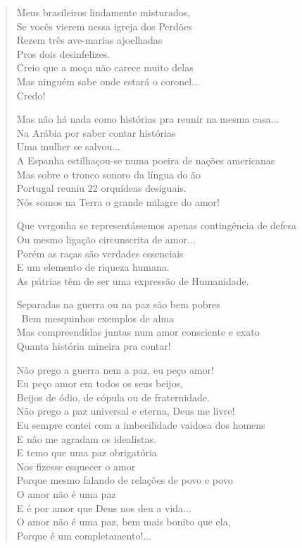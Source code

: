 \begin{verse}
Meus brasileiros lindamente misturados,\\
Se vocês vierem nessa igreja dos Perdões\\
Rezem três ave-marias ajoelhadas\\
Pros dois desinfelizes.\\
Creio que a moça não carece muito delas\\
Mas ninguém sabe onde estará o coronel...\\
Credo!

Mas não há nada como histórias pra reunir na mesma casa...\\
Na Arábia por saber contar histórias\\
Uma mulher se salvou...\\
A Espanha estilhaçou-se numa poeira de nações americanas\\
Mas sobre o tronco sonoro da língua do ão\\
Portugal reuniu 22 orquídeas desiguais.\\
Nós somos na Terra o grande milagre do amor!

Que vergonha se representássemos apenas contingência de defesa\\
Ou mesmo ligação circunscrita de amor...\\
Porém as raças são verdades essenciais\\
E um elemento de riqueza humana.\\
As pátrias têm de ser uma expressão de Humanidade.

Separadas na guerra ou na paz são bem pobres\\\
Bem mesquinhos exemplos de alma\\
Mas compreendidas juntas num amor consciente e exato\\
Quanta história mineira pra contar!

Não prego a guerra nem a paz, eu peço amor!\\
Eu peço amor em todos os seus beijos,\\
Beijos de ódio, de cópula ou de fraternidade.\\
Não prego a paz universal e eterna, Deus me livre!\\
Eu sempre contei com a imbecilidade vaidosa dos homens\\
E não me agradam os idealistas.\\
E temo que uma paz obrigatória\\
Nos fizesse esquecer o amor\\
Porque mesmo falando de relações de povo e povo\\
O amor não é uma paz\\
E é por amor que Deus nos deu a vida...\\
O amor não é uma paz, bem mais bonito que ela,\\
Porque é um completamento!...


\end{verse}
